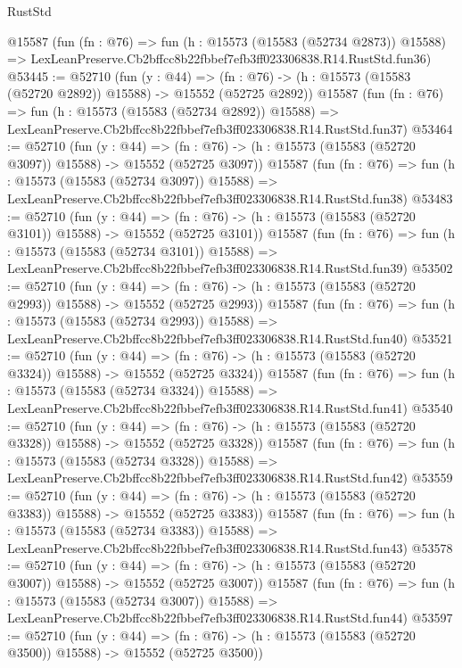 \begin{lexlean}{RustStd}
\begin{coremodule}
    @15587
    (fun (fn : @76) =>
    fun (h : @15573 (@15583 (@52734 @2873)) @15588) =>
    LexLeanPreserve.Cb2bffcc8b22fbbef7efb3ff023306838.R14.RustStd.fun36)
@53445 := @52710
    (fun (y : @44) =>
    (fn : @76) -> (h : @15573 (@15583 (@52720 @2892)) @15588) -> @15552 (@52725 @2892))
    @15587
    (fun (fn : @76) =>
    fun (h : @15573 (@15583 (@52734 @2892)) @15588) =>
    LexLeanPreserve.Cb2bffcc8b22fbbef7efb3ff023306838.R14.RustStd.fun37)
@53464 := @52710
    (fun (y : @44) =>
    (fn : @76) -> (h : @15573 (@15583 (@52720 @3097)) @15588) -> @15552 (@52725 @3097))
    @15587
    (fun (fn : @76) =>
    fun (h : @15573 (@15583 (@52734 @3097)) @15588) =>
    LexLeanPreserve.Cb2bffcc8b22fbbef7efb3ff023306838.R14.RustStd.fun38)
@53483 := @52710
    (fun (y : @44) =>
    (fn : @76) -> (h : @15573 (@15583 (@52720 @3101)) @15588) -> @15552 (@52725 @3101))
    @15587
    (fun (fn : @76) =>
    fun (h : @15573 (@15583 (@52734 @3101)) @15588) =>
    LexLeanPreserve.Cb2bffcc8b22fbbef7efb3ff023306838.R14.RustStd.fun39)
@53502 := @52710
    (fun (y : @44) =>
    (fn : @76) -> (h : @15573 (@15583 (@52720 @2993)) @15588) -> @15552 (@52725 @2993))
    @15587
    (fun (fn : @76) =>
    fun (h : @15573 (@15583 (@52734 @2993)) @15588) =>
    LexLeanPreserve.Cb2bffcc8b22fbbef7efb3ff023306838.R14.RustStd.fun40)
@53521 := @52710
    (fun (y : @44) =>
    (fn : @76) -> (h : @15573 (@15583 (@52720 @3324)) @15588) -> @15552 (@52725 @3324))
    @15587
    (fun (fn : @76) =>
    fun (h : @15573 (@15583 (@52734 @3324)) @15588) =>
    LexLeanPreserve.Cb2bffcc8b22fbbef7efb3ff023306838.R14.RustStd.fun41)
@53540 := @52710
    (fun (y : @44) =>
    (fn : @76) -> (h : @15573 (@15583 (@52720 @3328)) @15588) -> @15552 (@52725 @3328))
    @15587
    (fun (fn : @76) =>
    fun (h : @15573 (@15583 (@52734 @3328)) @15588) =>
    LexLeanPreserve.Cb2bffcc8b22fbbef7efb3ff023306838.R14.RustStd.fun42)
@53559 := @52710
    (fun (y : @44) =>
    (fn : @76) -> (h : @15573 (@15583 (@52720 @3383)) @15588) -> @15552 (@52725 @3383))
    @15587
    (fun (fn : @76) =>
    fun (h : @15573 (@15583 (@52734 @3383)) @15588) =>
    LexLeanPreserve.Cb2bffcc8b22fbbef7efb3ff023306838.R14.RustStd.fun43)
@53578 := @52710
    (fun (y : @44) =>
    (fn : @76) -> (h : @15573 (@15583 (@52720 @3007)) @15588) -> @15552 (@52725 @3007))
    @15587
    (fun (fn : @76) =>
    fun (h : @15573 (@15583 (@52734 @3007)) @15588) =>
    LexLeanPreserve.Cb2bffcc8b22fbbef7efb3ff023306838.R14.RustStd.fun44)
@53597 := @52710
    (fun (y : @44) =>
    (fn : @76) -> (h : @15573 (@15583 (@52720 @3500)) @15588) -> @15552 (@52725 @3500))

\end{coremodule}
\end{lexlean}
